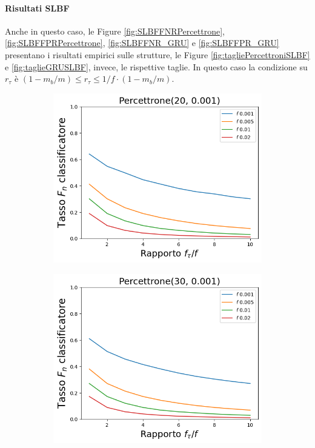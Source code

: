 \documentclass[../../main.tex]{subfiles}
\begin{document}
    \paragraph{Risultati SLBF}
    Anche in questo caso, le Figure \ref{fig:SLBFFNRPercettrone}, \ref{fig:SLBFFPRPercettrone}, \ref{fig:SLBFFNR_GRU} e \ref{fig:SLBFFPR_GRU} presentano i risultati empirici sulle strutture, le Figure \ref{fig:tagliePercettroniSLBF} e \ref{fig:taglieGRUSLBF}, invece, le rispettive taglie. In questo caso la condizione su $r_{\tau}$ è $(1 - m_b/m) \leq r_{\tau} \leq 1/f \cdot \left(1 - m_b/m\right)$.
    \begin{figure}[H]
        \centering
        \begin{subfigure}[b]{0.49\textwidth}
            \centering
            \includegraphics[width = \textwidth]{immagini/7/SLBF/Percettrone(20, 0.001)_FNR.png}
            \caption{}
            \label{fig:SLBFFNRPercettrone20}
        \end{subfigure}
        \begin{subfigure}[b]{0.49\textwidth}
            \centering
            \includegraphics[width = \textwidth]{immagini/7/SLBF/Percettrone(30, 0.001)_FNR.png}

\end{subfigure}
\end{figure}
\end{document}
